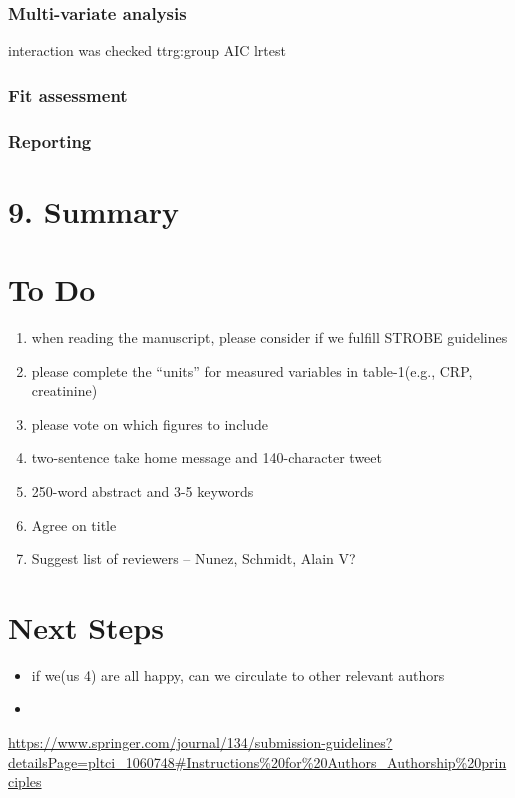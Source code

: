 \documentclass[
]{article}
\providecommand{\tightlist}{%
  \setlength{\itemsep}{0pt}\setlength{\parskip}{0pt}}
\begin{document}
\hypertarget{multi-variate-analysis}{%
\subsubsection{Multi-variate analysis}\label{multi-variate-analysis}}

interaction was checked ttrg:group AIC lrtest

\hypertarget{fit-assessment-2}{%
\subsubsection{Fit assessment}\label{fit-assessment-2}}

\hypertarget{reporting-1}{%
\subsubsection{Reporting}\label{reporting-1}}

\hypertarget{summary}{%
\section{9. Summary}\label{summary}}

\hypertarget{to-do}{%
\section{To Do}\label{to-do}}

\begin{enumerate}
\def\labelenumi{\arabic{enumi}.}
\tightlist
\item
  when reading the manuscript, please consider if we fulfill STROBE
  guidelines
\item
  please complete the ``units'' for measured variables in table-1(e.g.,
  CRP, creatinine)
\item
  please vote on which figures to include
\item
  two-sentence take home message and 140-character tweet
\item
  250-word abstract and 3-5 keywords
\item
  Agree on title
\item
  Suggest list of reviewers -- Nunez, Schmidt, Alain V?
\end{enumerate}

\hypertarget{next-steps}{%
\section{Next Steps}\label{next-steps}}

\begin{itemize}
\tightlist
\item
  if we(us 4) are all happy, can we circulate to other relevant authors
\item
\end{itemize}

\url{https://www.springer.com/journal/134/submission-guidelines?detailsPage=pltci_1060748\#Instructions\%20for\%20Authors_Authorship\%20principles}
\end{document}
